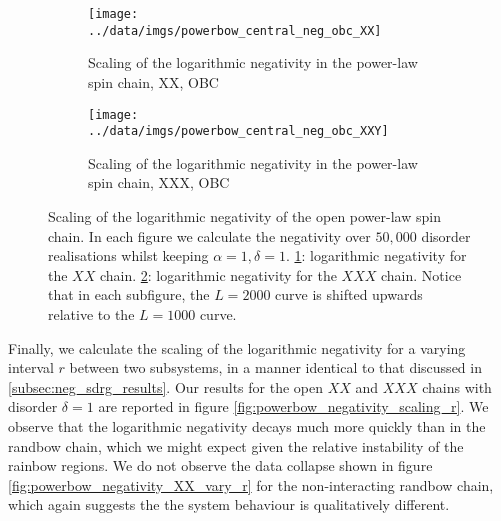 \begin{figure}[h]
     \centering
     \begin{subfigure}[b]{0.8\textwidth}
   \centering
    \texttt{[image: ../data/imgs/powerbow\_central\_neg\_obc\_XX]}
    \caption{Scaling of the logarithmic negativity in the power-law spin chain, XX, OBC}
    \label{fig:powerbow_negativity_XX}
    \end{subfigure}%
     \hfill
     \begin{subfigure}[b]{0.8\textwidth}
         \centering
   \texttt{[image: ../data/imgs/powerbow\_central\_neg\_obc\_XXY]}
    \caption{Scaling of the logarithmic negativity in the power-law spin chain, XXX, OBC}
    \label{fig:powerbow_negativity_XXX}

         \end{subfigure}
            \caption{Scaling of the logarithmic negativity of the open power-law spin chain. In each figure we calculate the negativity over $50,000$ disorder realisations whilst keeping $\alpha =1, \delta = 1$. \ref{fig:powerbow_negativity_XX}: logarithmic negativity for the $XX$ chain. \ref{fig:powerbow_negativity_XXX}: logarithmic negativity for the $XXX$ chain. Notice that in each subfigure, the $L = 2000$ curve is shifted upwards relative to the $L = 1000$ curve.}
        \label{fig:powerbow_negativity_scaling}
\end{figure}

Finally, we calculate the scaling of the logarithmic negativity for a varying interval $r$ between two subsystems, in a manner identical to that discussed in \ref{subsec:neg_sdrg_results}. Our results for the open $XX$ and $XXX$ chains with disorder $\delta = 1$ are reported in figure \ref{fig:powerbow_negativity_scaling_r}. We observe that the logarithmic negativity decays much more quickly than in the randbow chain, which we might expect given the relative instability of the rainbow regions. We do not observe the data collapse shown in figure \ref{fig:powerbow_negativity_XX_vary_r} for the non-interacting randbow chain, which again suggests the the system behaviour is qualitatively different.


